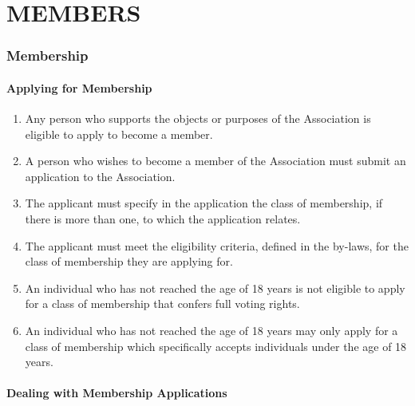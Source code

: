 \documentclass[../constitution.tex]{subfiles}
\begin{document}
\part{MEMBERS} \label{part-3-members}


\section{Membership} \label{division-1-membership}

\subsection{Applying for Membership} \label{applying-for-membership}

\begin{enumerate}
  \item Any person who supports the objects or purposes of the Association is eligible to apply to become a member. \label{member-is-eligibile}
  \item A person who wishes to become a member of the Association must submit an application to the Association. \label{member-must-submit-application}
  \item The applicant must specify in the application the class of membership, if there is more than one, to which the application relates.
  \item The applicant must meet the eligibility criteria, defined in the by-laws, for the class of membership they are applying for. \label{eligible-for-class-of-membership}
  \item An individual who has not reached the age of 18 years is not eligible to apply for a class of membership that confers full voting rights. \label{eligible-for-voting-rights}
  \item An individual who has not reached the age of 18 years may only apply for a class of membership which specifically accepts individuals under the age of 18 years. \label{members-under-18-years}
\end{enumerate}

\subsection{Dealing with Membership Applications}\label{dealing-with-membership-applications}
\end{document}
